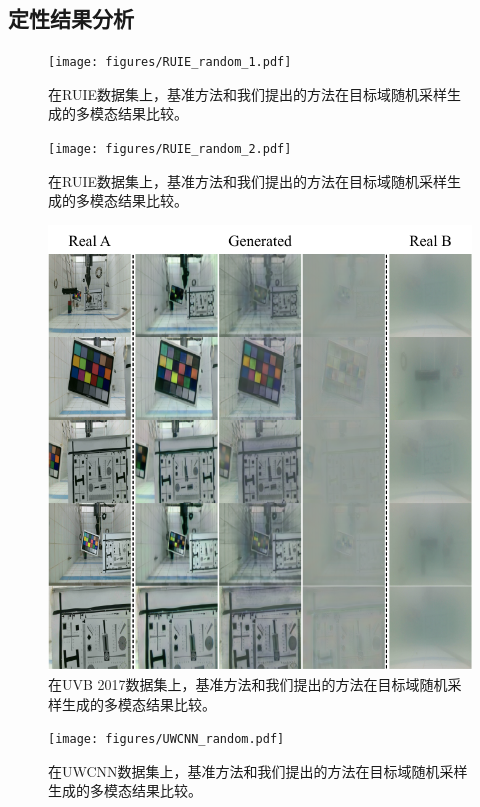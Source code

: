\subsection{定性结果分析}

\begin{figure}[htp]
    \centering
	\texttt{[image: figures/RUIE\_random\_1.pdf]}
	\caption{在RUIE数据集上，基准方法和我们提出的方法在目标域随机采样生成的多模态结果比较。}
	\label{fig:ruie_random_1}
\end{figure}

\begin{figure}[htp]
    \centering
	\texttt{[image: figures/RUIE\_random\_2.pdf]}
	\caption{在RUIE数据集上，基准方法和我们提出的方法在目标域随机采样生成的多模态结果比较。}
	\label{fig:ruie_random_2}
\end{figure}

\begin{figure}[htp]
    \centering
	\includegraphics[width=\textwidth]{figures/UVB_random.pdf}
	\caption{在UVB 2017数据集上，基准方法和我们提出的方法在目标域随机采样生成的多模态结果比较。}
	\label{fig:uvb_random}
\end{figure}

\begin{figure}[htp]
    \centering
	\texttt{[image: figures/UWCNN\_random.pdf]}
	\caption{在UWCNN数据集上，基准方法和我们提出的方法在目标域随机采样生成的多模态结果比较。}
	\label{fig:uwcnn_random}
\end{figure}

